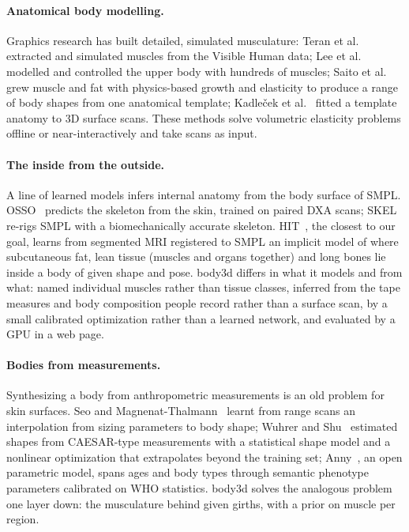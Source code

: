 \documentclass[10pt,twocolumn]{article}
\begin{document}
\paragraph{Anatomical body modelling.}
Graphics research has built detailed, simulated musculature: Teran et al.~\cite{teran2005muscle}
extracted and simulated muscles from the Visible Human data; Lee et
al.~\cite{lee2009upperbody} modelled and controlled the upper body with hundreds of muscles; Saito
et al.~\cite{saito2015bodybuilding} grew muscle and fat with physics-based growth and elasticity to
produce a range of body shapes from one anatomical template; Kadle\v{c}ek et
al.~\cite{kadlecek2016anatomy} fitted a template anatomy to 3D surface scans. These methods solve
volumetric elasticity problems offline or near-interactively and take scans as input.

\paragraph{The inside from the outside.}
A line of learned models infers internal anatomy from the body surface of SMPL.
OSSO~\cite{keller2022osso} predicts the skeleton from the skin, trained on paired DXA scans;
SKEL~\cite{keller2023skel} re-rigs SMPL with a biomechanically accurate skeleton.
HIT~\cite{keller2024hit}, the closest to our goal, learns from segmented MRI registered to SMPL an
implicit model of where subcutaneous fat, lean tissue (muscles and organs together) and long bones
lie inside a body of given shape and pose. body3d differs in what it models and from what: named
individual muscles rather than tissue classes, inferred from the tape measures and body composition
people record rather than a surface scan, by a small calibrated optimization rather than a learned
network, and evaluated by a GPU in a web page.

\paragraph{Bodies from measurements.}
Synthesizing a body from anthropometric measurements is an old problem for skin surfaces. Seo and
Magnenat-Thalmann~\cite{seo2003sizing} learnt from range scans an interpolation from sizing
parameters to body shape; Wuhrer and Shu~\cite{wuhrer2013measurements} estimated shapes from
CAESAR-type measurements with a statistical shape model and a nonlinear optimization that
extrapolates beyond the training set; Anny~\cite{bregier2025anny}, an open parametric model, spans
ages and body types through semantic phenotype parameters calibrated on WHO statistics. body3d
solves the analogous problem one layer down: the musculature behind given girths, with a prior on
muscle per region.
\end{document}
